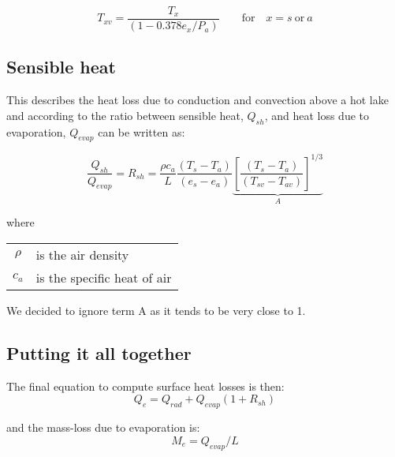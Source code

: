 \documentclass{bmcart}
\begin{document}
\begin{equation}\label{vtemp}
T_{xv} = \frac{T_x}{(1-0.378e_x/P_a)} \qquad \mathrm{for}\quad x = s\ \mathrm{or}\ a
\end{equation}

\subsection{Sensible heat}
This describes the heat loss due to conduction and convection above a hot lake
and according to \cite{Stevenson1992} the ratio between sensible heat,
$Q_{sh}$, and heat loss due to evaporation, $Q_{evap}$ can be written as:

\begin{equation}
    \frac{Q_{sh}}{Q_{evap}}=R_{sh}=\frac{\rho c_a}{L} \frac{(T_s - T_a)}{(e_s - e_a)}
    \underbrace{\left [ \frac{(T_s-T_a)}{(T_{sv} - T_{av})} \right ]^{1/3}}_A 
\end{equation}

where

\begin{table}[h!]
\begin{tabular}{cp{8cm}}
    $\rho$ & is the air density \\
    $c_a$ & is the specific heat of air\\
\end{tabular}
\end{table}

We decided to ignore term A as it tends to be very close to 1.

\subsection{Putting it all together}
The final equation to compute surface heat losses is then:
\begin{equation}
    Q_e = Q_{rad} + Q_{evap}(1+R_{sh})
\end{equation}

and the mass-loss due to evaporation is:
\begin{equation}
    M_e = Q_{evap}/L
\end{equation}





\end{document}
